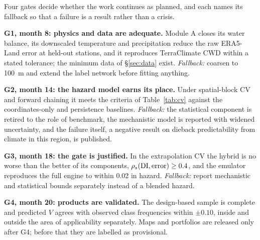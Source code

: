 Four gates decide whether the work continues as planned, and each names its fallback so that a failure is a result rather than a crisis.

\textbf{G1, month 8: physics and data are adequate.} Module A closes its water balance, its downscaled temperature and precipitation reduce the raw ERA5-Land error at held-out stations, and it reproduces TerraClimate CWD within a stated tolerance; the minimum data of \S\ref{sec:data} exist. \emph{Fallback:} coarsen to 100~m and extend the label network before fitting anything.

\textbf{G2, month 14: the hazard model earns its place.} Under spatial-block CV and forward chaining it meets the criteria of Table~\ref{tab:cv} against the coordinates-only and persistence baselines. \emph{Fallback:} the statistical component is retired to the role of benchmark, the mechanistic model is reported with widened uncertainty, and the failure itself, a negative result on dieback predictability from climate in this region, is published.

\textbf{G3, month 18: the gate is justified.} In the extrapolation CV the hybrid is no worse than the better of its components, $\rho_s(\mathrm{DI},\text{error})\ge0.4$, and the emulator reproduces the full engine to within 0.02 in hazard. \emph{Fallback:} report mechanistic and statistical bounds separately instead of a blended hazard.

\textbf{G4, month 20: products are validated.} The design-based sample is complete and predicted $V$ agrees with observed class frequencies within $\pm0.10$, inside and outside the area of applicability separately. Maps and portfolios are released only after G4; before that they are labelled as provisional.

